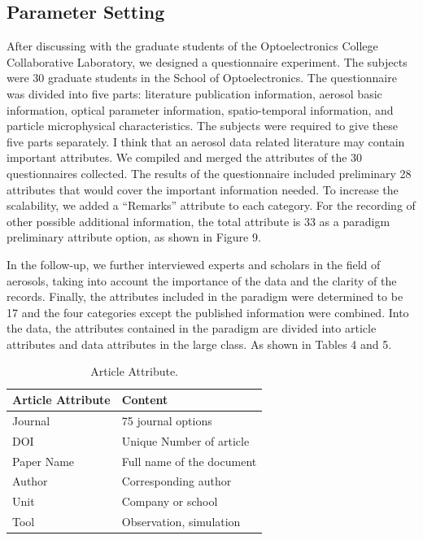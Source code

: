 \subsection{Parameter Setting}
After discussing with the graduate students of the Optoelectronics College Collaborative Laboratory, we designed a questionnaire experiment. The subjects were 30 graduate students in the School of Optoelectronics. The questionnaire was divided into five parts: literature publication information, aerosol basic information, optical parameter information, spatio-temporal information, and particle microphysical characteristics. The subjects were required to give these five parts separately. I think that an aerosol data related literature may contain important attributes. We compiled and merged the attributes of the 30 questionnaires collected. The results of the questionnaire included preliminary 28 attributes that would cover the important information needed. To increase the scalability, we added a “Remarks” attribute to each category. For the recording of other possible additional information, the total attribute is 33 as a paradigm preliminary attribute option, as shown in Figure 9.

In the follow-up, we further interviewed experts and scholars in the field of aerosols, taking into account the importance of the data and the clarity of the records. Finally, the attributes included in the paradigm were determined to be 17 and the four categories except the published information were combined. Into the data, the attributes contained in the paradigm are divided into article attributes and data attributes in the large class. As shown in Tables 4 and 5.

\begin{table}
	\caption{Article Attribute.}
	\label{tab:freq}
	\begin{tabular}{ll}
		\toprule
		Article Attribute&Content\\
		\midrule
		Journal & 75 journal options\\
		DOI & Unique Number of article\\
		Paper Name & Full name of the document\\
		Author & Corresponding author\\
		Unit & Company or school\\
		Tool & Observation, simulation\\
		\bottomrule
	\end{tabular}
\end{table}

